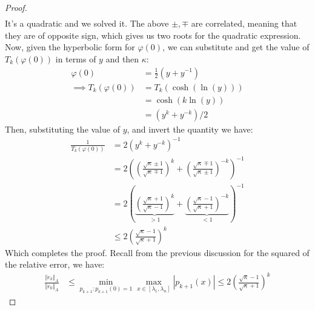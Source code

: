 \documentclass[]{article}
\theoremstyle{definition}
\begin{document}
\begin{proof}
\begin{align}
                \end{align}
                It's a quadratic and we solved it. The above $\pm, \mp$ are correlated, meaning that they are of opposite sign, which gives us two roots for the quadratic expression. Now, given the hyperbolic form for $\varphi(0)$, we can substitute and get the value of $T_k(\varphi(0))$ in terms of $y$ and then $\kappa$: 
                \begin{align}
                    \varphi(0)&= \frac{1}{2}(y + y^{-1})
                    \\
                    \implies 
                    T_k(\varphi(0)) &= 
                    T_k(\cosh(\ln(y)))
                    \\
                    &= \cosh(k\ln(y))
                    \\
                    &= (y^k + y^{-k})/2
                \end{align}
                Then, substituting the value of $y$, and invert the quantity we have: 
                \begin{align}
                    \frac{1}{T_k(\varphi(0))} &= 2(y^k + y^{-k})^{-1}
                    \\
                    &= 
                    2\left(
                        \left(
                            \frac{\sqrt{\kappa}\pm 1}{\sqrt{\kappa}\mp 1}
                        \right)^{k} + 
                        \left(
                            \frac{\sqrt{\kappa}\mp 1}{\sqrt{\kappa}\pm 1}
                        \right)^{-k}
                    \right)^{-1}
                    \\
                    &= 2\left(
                        \underbrace{\left(
                            \frac{\sqrt{\kappa}+ 1}{\sqrt{\kappa}- 1}
                        \right)^{k}}_{> 1} + 
                        \underbrace{\left(
                            \frac{\sqrt{\kappa}- 1}{\sqrt{\kappa}+ 1}
                        \right)^{-k}}_{ < 1}
                    \right)^{-1}\label{line:CG_Cheb_Bound}
                    \\
                    & \le 2 \left(
                        \frac{\sqrt{\kappa} - 1}{\sqrt{\kappa} + 1}
                    \right)^k
                \end{align}
                Which completes the proof. Recall from the previous discussion for the squared of the relative error, we have: 
                \begin{align}
                    \frac{\Vert e_k\Vert_A}{\Vert e_0\Vert_A} &\le 
                    \min_{p_{k + 1}: p_{k + 1}(0) = 1}\max_{x\in [\lambda_{1}, \lambda_{n}]} |p_{k + 1}(x)| \le 
                    2 \left(
                        \frac{\sqrt{\kappa} - 1}{\sqrt{\kappa} + 1}
                    \right)^k
                \end{align}

            \end{proof}
\end{document}
